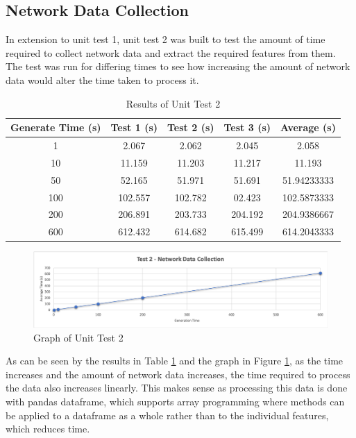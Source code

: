 \subsection{Network Data Collection}
In extension to unit test 1, unit test 2 was built to test the amount of time required to collect network data and extract the required features from them. The test was run for differing times to see how increasing the amount of network data would alter the time taken to process it.
\begin{table}[H]
\centering
\caption{Results of Unit Test 2}
\label{table:unittest2}
\begin{tabular}{ccccc}
 \textbf{Generate Time (s)}&\textbf{Test 1 (s)}&\textbf{Test 2 (s)}&\textbf{Test 3 (s)}&\textbf{Average (s)}\\
 \hline
    1 & 2.067& 2.062& 2.045& 2.058\\
    10& 11.159& 11.203& 11.217& 11.193\\
    50& 52.165& 51.971& 51.691& 51.94233333\\
    100& 102.557& 102.782& 02.423& 102.5873333\\
    200& 206.891& 203.733& 204.192& 204.9386667\\
    600& 612.432& 614.682& 615.499& 614.2043333\\
\end{tabular}
\end{table}
\begin{figure}[H]
    \centering
    \includegraphics[scale = 0.5]{Images/Results/unittest2.png}
    \caption{Graph of Unit Test 2}
     \label{fig:unittest2}
\end{figure}
As can be seen by the results in Table \ref{table:unittest2} and the graph in Figure \ref{fig:unittest2}, as the time increases and the amount of network data increases, the time required to process the data also increases linearly. This makes sense as processing this data is done with pandas dataframe, which supports array programming where methods can be applied to a dataframe as a whole rather than to the individual features, which reduces time.

